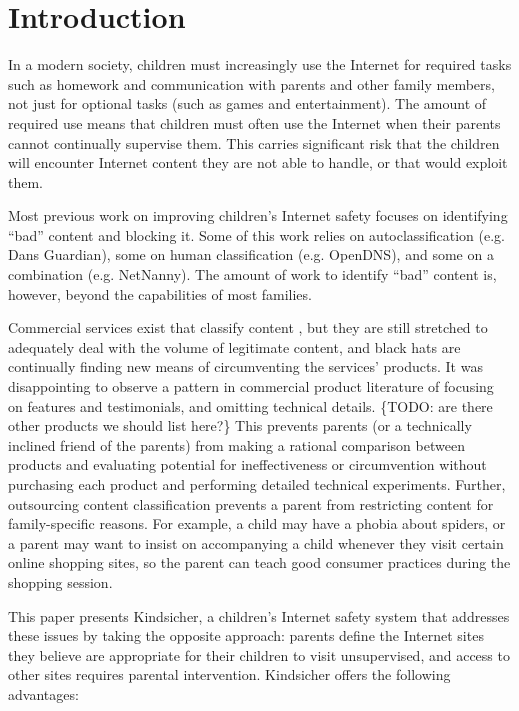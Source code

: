 
\section{Introduction}

In a modern society, children must increasingly use the Internet for required
tasks such as homework and communication with parents and other family
members, not just for optional tasks (such as games and entertainment). 
%
The amount of required use means that children must often use the Internet
when their parents cannot continually supervise them. 
%
This carries significant risk that the children will encounter Internet
content they are not able to handle, or that would exploit them. 

Most previous work on improving children's Internet safety focuses on
identifying ``bad'' content and blocking it. Some of this work relies
on autoclassification (e.g. Dans Guardian\cite{dansguardian}), some on
human classification (e.g. OpenDNS\cite{opendns}), and some on a
combination (e.g. NetNanny\cite{netnanny}).
%
The amount of work to identify ``bad'' content is, however, beyond the
capabilities of most families.

Commercial services exist that classify content \cite{opendns}\cite{netnanny},
but they are still stretched to adequately deal with the volume of legitimate
content, and black hats are continually finding new means of circumventing the
services' products.
%
It was disappointing to observe a pattern in commercial product literature of
focusing on features and testimonials, and omitting technical
details.\cite{opendns} \{TODO: are there other products we should list here?\}
%
This prevents parents (or a technically inclined friend of the parents) from
making a rational comparison between products and evaluating potential for
ineffectiveness or circumvention without purchasing each product and
performing detailed technical experiments.
%
Further, outsourcing content classification prevents a parent from restricting
content for family-specific reasons. 
%
For example, a child may have a phobia about spiders, or a parent may want to
insist on accompanying a child whenever they visit certain online shopping
sites, so the parent can teach good consumer practices during the shopping
session. 

This paper presents Kindsicher, a children's Internet safety system
that addresses these issues by taking the opposite approach: parents
define the Internet sites they believe are appropriate for their
children to visit unsupervised, and access to other sites requires
parental intervention.
%
Kindsicher offers the following advantages:

